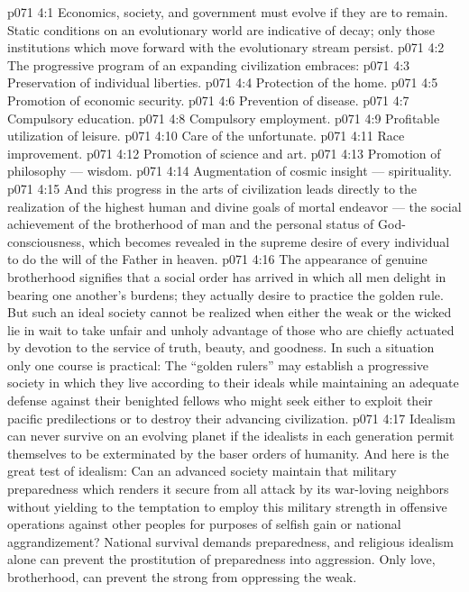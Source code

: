 \vs p071 4:1 Economics, society, and government must evolve if they are to remain. Static conditions on an evolutionary world are indicative of decay; only those institutions which move forward with the evolutionary stream persist.
\vs p071 4:2 \pc The progressive program of an expanding civilization embraces:
\vs p071 4:3 \bibnobreakspace Preservation of individual liberties.
\vs p071 4:4 \bibnobreakspace Protection of the home.
\vs p071 4:5 \bibnobreakspace Promotion of economic security.
\vs p071 4:6 \bibnobreakspace Prevention of disease.
\vs p071 4:7 \bibnobreakspace Compulsory education.
\vs p071 4:8 \bibnobreakspace Compulsory employment.
\vs p071 4:9 \bibnobreakspace Profitable utilization of leisure.
\vs p071 4:10 \bibnobreakspace Care of the unfortunate.
\vs p071 4:11 \bibnobreakspace Race improvement.
\vs p071 4:12 \bibnobreakspace Promotion of science and art.
\vs p071 4:13 \bibnobreakspace Promotion of philosophy --- wisdom.
\vs p071 4:14 \bibnobreakspace Augmentation of cosmic insight --- spirituality.
\vs p071 4:15 \pc And this progress in the arts of civilization leads directly to the realization of the highest human and divine goals of mortal endeavor --- the social achievement of the brotherhood of man and the personal status of God\hyp{}consciousness, which becomes revealed in the supreme desire of every individual to do the will of the Father in heaven.
\vs p071 4:16 The appearance of genuine brotherhood signifies that a social order has arrived in which all men delight in bearing one another’s burdens; they actually desire to practice the golden rule. But such an ideal society cannot be realized when either the weak or the wicked lie in wait to take unfair and unholy advantage of those who are chiefly actuated by devotion to the service of truth, beauty, and goodness. In such a situation only one course is practical: The “golden rulers” may establish a progressive society in which they live according to their ideals while maintaining an adequate defense against their benighted fellows who might seek either to exploit their pacific predilections or to destroy their advancing civilization.
\vs p071 4:17 Idealism can never survive on an evolving planet if the idealists in each generation permit themselves to be exterminated by the baser orders of humanity. And here is the great test of idealism: Can an advanced society maintain that military preparedness which renders it secure from all attack by its war\hyp{}loving neighbors without yielding to the temptation to employ this military strength in offensive operations against other peoples for purposes of selfish gain or national aggrandizement? National survival demands preparedness, and religious idealism alone can prevent the prostitution of preparedness into aggression. Only love, brotherhood, can prevent the strong from oppressing the weak.
